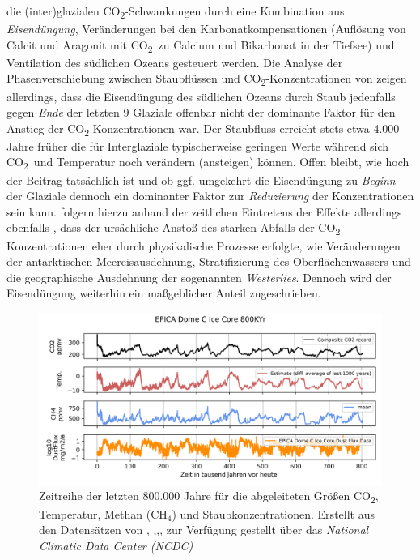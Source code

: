 \documentclass[12pt,a4paper,onecolumn]{scrartcl}
\newcommand{\cotwo}{CO\textsubscript{2}}
\begin{document}
die (inter)glazialen \cotwo -Schwankungen durch eine Kombination aus \textit{Eisendüngung}, Veränderungen bei den Karbonatkompensationen (Auflösung von Calcit und Aragonit mit  \cotwo \ zu Calcium und Bikarbonat in der Tiefsee) und Ventilation des südlichen Ozeans \citep{Lambert.2012} gesteuert werden. Die Analyse der Phasenverschiebung zwischen Staubflüssen und \cotwo -Konzentrationen von \citet{Lambert.2012} zeigen allerdings, dass die Eisendüngung des südlichen Ozeans durch Staub jedenfalls gegen \textit{Ende} der letzten 9 Glaziale offenbar nicht der dominante Faktor für den Anstieg der \cotwo -Konzentrationen war. Der Staubfluss erreicht stets etwa 4.000 Jahre früher die für Interglaziale typischerweise  geringen Werte während sich \cotwo \ und Temperatur noch verändern (ansteigen) können. Offen bleibt, wie hoch der Beitrag tatsächlich ist und ob ggf. umgekehrt die Eisendüngung zu \textit{Beginn} der Glaziale dennoch ein dominanter Faktor zur \textit{Reduzierung} der Konzentrationen sein kann. \citet{MartinezGarcia.2009} folgern hierzu anhand der zeitlichen Eintretens der Effekte allerdings ebenfalls , dass der ursächliche Anstoß des starken Abfalls der \cotwo -Konzentrationen eher durch physikalische Prozesse erfolgte, wie Veränderungen der antarktischen Meereisausdehnung, Stratifizierung des Oberflächenwassers und die geographische Ausdehnung der sogenannten \textit{Westerlies}. Dennoch wird der Eisendüngung weiterhin ein maßgeblicher Anteil zugeschrieben.

\begin{figure}[ht]
\centering
\includegraphics[width=\textwidth]{bilder/epica_icecore.png}
\caption{ Zeitreihe der letzten 800.000 Jahre für die abgeleiteten Größen \cotwo, Temperatur, Methan (CH$_4$) und Staubkonzentrationen. Erstellt aus den Datensätzen von \cite{Jouzel.2007}, \cite{Lambert.2012},\cite{Loulergue.2008},\cite{Bereiter.2015}, zur Verfügung gestellt über das \textit{National Climatic Data Center (NCDC) }  }   \label{fig:icecore}
\end{figure}
\end{document}
